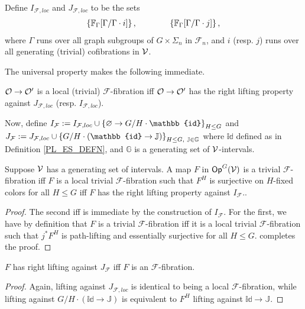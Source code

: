 \documentclass[a4paper,10pt
,draft
]{article}%
\renewcommand{\F}{\mathcal F}
\newcommand{\J}{\mathbb J}
\renewcommand{\1}{\ensuremath{\mathbb{id}}}
\begin{document}
Define $I_{\F,loc}$ and $J_{\F, loc}$ to be the sets
\begin{align*}
  \left\{\mathbb F_\Gamma[\Gamma/\Gamma \cdot i]\right\}, \qquad \qquad \left\{\mathbb F_\Gamma[\Gamma/\Gamma \cdot j]\right\},
\end{align*}
where $\Gamma$ runs over all graph subgroups of $G \times \Sigma_n$ in $\F_n$,
and $i$ (resp. $j$) runs over all generating (trivial) cofibrations in $\mathcal V$.

The universal property makes the following immediate.
\begin{corollary}
      $\mathcal{O} \to \mathcal{O}'$ is a local (trivial) $\F$-fibration iff
      $\mathcal{O} \to \mathcal{O}'$ has the right lifting property against $J_{\F, loc}$ (resp. $I_{\F, loc}$).
\end{corollary}

Now, define $I_{\F}:= I_{\F, loc} \mathbin{\cup} \set{\varnothing \to G/H \cdot \1}_{H\leq G}$
and
$J_{\F} := J_{\F, loc} \mathbin{\cup} \set{G/H \cdot (\1 \to \J)}_{H\leq G,\ \J\in\mathbb{G}}$
where $\1$ defined as in Definition \ref{PL_ES_DEFN}, and $\mathbb{G}$ is a generating set of $\mathcal V$-intervals. 

\begin{lemma}
      \label{CAV_4.8}
      Suppose $\mathcal V$ has a generating set of intervals.
      A map $F$ in $\mathsf{Op}^G(\mathcal V)$ is a trivial $\F$-fibration
      iff
      $F$ is a local trivial $\F$-fibration such that $F^H$ is surjective on $H$-fixed colors for all $H\leq G$
      iff
      $F$ has the right lifting property against $I_{\F}$.. 
\end{lemma}
\begin{proof}
      The second iff is immediate by the construction of $I_{\F}$.
      For the first, we have by definition that
      $F$ is a trivial $\F$-fibration
      iff
      it is a local trivial $\F$-fibration such that $j^*F^H$ is path-lifting and essentially surjective for all $H\leq G$.
      \cite[2.4]{BM13} completes the proof. 
\end{proof}

\begin{lemma}
      $F$ has right lifting against $J_{\F}$ iff $F$ is an $\F$-fibration.
\end{lemma}
\begin{proof}
      Again, lifting against $J_{\F, loc}$ is identical to being a local $\F$-fibration, while lifting against $G/H \cdot (\1 \to \J)$
      is equivalent to $F^H$ lifting against $\1 \to \J$.
\end{proof}
\end{document}
